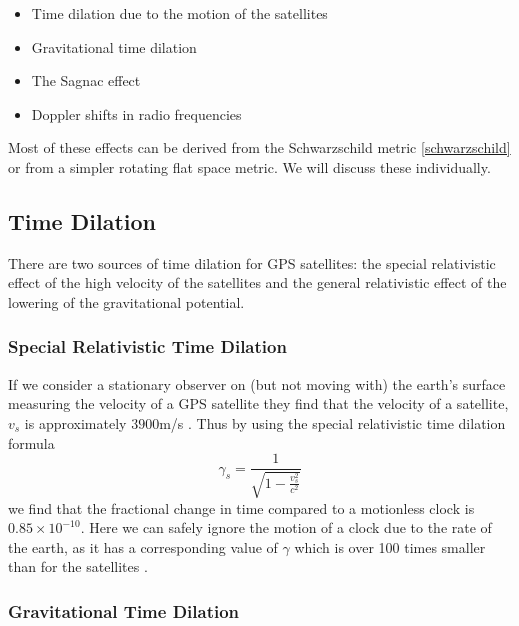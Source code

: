 \begin{itemize}
  \item Time dilation due to the motion of the satellites %
  \item Gravitational time dilation %
  \item The Sagnac effect %
  \item Doppler shifts in radio frequencies %
\end{itemize}  

Most of these effects can be derived from the Schwarzschild metric \eqref{schwarzschild} or from a simpler rotating flat space metric. We will discuss these individually.

\subsection{Time Dilation}

There are two sources of time dilation for GPS satellites: the special relativistic effect of the high velocity of the satellites and the general relativistic effect of the lowering of the gravitational potential.

\subsubsection{Special Relativistic Time Dilation} 

If we consider a stationary observer on (but not moving with) the earth's surface measuring the velocity of a GPS satellite they find that the velocity of a satellite, $v_s$ is approximately $3900$m/s \cite{cheng}. Thus by using the special relativistic time dilation formula 
\begin{equation} \label{gamma}
\gamma_s = \frac{1}{\sqrt{1 - \frac{v_s^2}{c^2}}}
\end{equation}
we find that the fractional change in time compared to a motionless clock is $0.85 \times 10^{-10}$. Here we can safely ignore the motion of a clock due to the rate of the earth, as it has a corresponding value of $\gamma$ which is over 100 times smaller than for the satellites \cite{cheng}.

\subsubsection{Gravitational Time Dilation}

